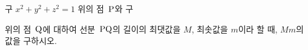 구 $x^2+y^2+z^2=1$ 위의 점~$\mathrm{P}$와 구 \par\smallskip{}\par\smallskip\noindent 위의 점~$\mathrm{Q}$에 대하여 선분~$\mathrm{PQ}$의 길이의 최댓값을 $M$, 최솟값을 $m$이라 할 때, $Mm$의 값을 구하시오.
